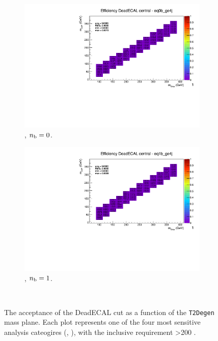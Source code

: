 \begin{figure}[h!]
\begin{subfigure}[b]{0.4\textwidth}
  \end{subfigure}\\
  \begin{subfigure}[b]{0.4\textwidth}
    \includegraphics[width=\textwidth, page=5]{Figs/sms/t2degen/v19/systs/T2_4body_DeadECAL_eq0b_ge4j.pdf}
    \caption{\njhigh, $n_{\text{b}} = 0$.}
  \end{subfigure}
  \begin{subfigure}[b]{0.4\textwidth}
    \includegraphics[width=\textwidth, page=5]{Figs/sms/t2degen/v19/systs/T2_4body_DeadECAL_eq1b_ge4j.pdf}
    \caption{\njhigh, $n_{\text{b}} = 1$.}
  \end{subfigure}\\
  \caption{The acceptance of the DeadECAL cut as a function of the \texttt{T2Degen}
  mass plane. Each plot represents one of the four most sensitive 
  analysis cateogires (\nb, \nj), with the inclusive requirement \HT>200 \gev.}
  \label{fig:sms-deadecal-t2degen}
\end{figure}

